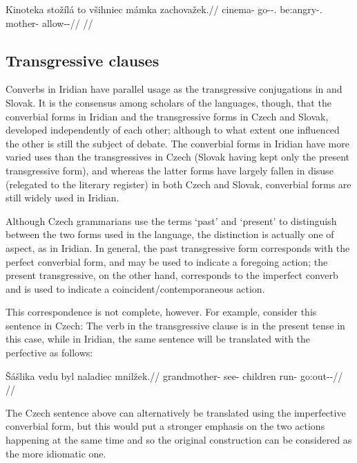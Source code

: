 \pex
\begingl
\gla Kinoteka stožílá to všihniec mámka zachovažek.//
\glb cinema-\Pat{} go-\Av{}-\Sbj{}.\Ipf{} \Rz{} be:angry-\Cv{}.\Ipf{} mother-\Dim{} allow-\Av{}-\Pf{}//
\glft {}//
\endgl
\xe


\subsection{Transgressive clauses}

Converbs in Iridian have parallel usage as the transgressive conjugations in  and Slovak. It is the consensus among scholars of the languages, though, that the converbial forms in Iridian and the transgressive forms in Czech and Slovak, developed independently of each other; although to what extent one influenced the other is still the subject of debate. The converbial forms in Iridian have more varied uses than the transgressives in Czech (Slovak having kept only the present transgressive form), and whereas the latter forms have largely fallen in disuse (relegated to the literary register) in both Czech and Slovak, converbial forms are still widely used in Iridian.

Although Czech grammarians use the terms `past' and `present' to distinguish between the two forms used in the language, the distinction is actually one of aspect, as in Iridian. In general, the past transgressive form corresponds with the perfect converbial form, and may be used to indicate a foregoing action; the present transgressive, on the other hand, corresponds to the imperfect converb and is used to indicate a coincident/contemporaneous action.

This correspondence is not complete, however. For example, consider this sentence in Czech:  The verb in the transgressive clause is in the present tense in this case, while in Iridian, the same sentence will be translated with the perfective as follows:

\pex
\begingl
\gla \v{S}ášlika vedu byl naladiec mnilžek.//
\glb grandmother- see- children run- go:out-\Av{}-\Pf{}//
\glft {}//
\endgl
\xe

The Czech sentence above can alternatively be translated using the imperfective converbial form, but this would put a stronger emphasis on the two actions happening at the same time and so the original construction can be considered as the more idiomatic one.

